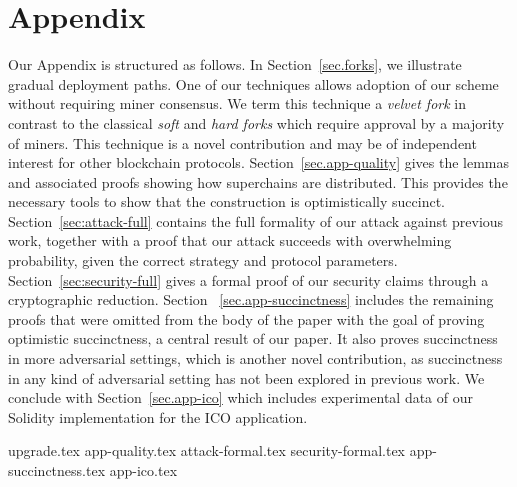 \appendix
\section*{Appendix}

Our Appendix is structured as follows. In Section~\ref{sec.forks}, we illustrate
gradual deployment paths. One of our techniques allows adoption of our scheme
without requiring miner consensus. We term this technique a \emph{velvet fork}
in contrast to the classical \emph{soft} and \emph{hard forks} which require
approval by a majority of miners. This technique is a novel contribution and may
be of independent interest for other blockchain protocols.
Section~\ref{sec.app-quality} gives the lemmas and associated proofs showing how
superchains are distributed. This provides the necessary tools to show that the
construction is optimistically succinct. Section~\ref{sec:attack-full} contains
the full formality of our attack against previous work, together with a proof
that our attack succeeds with overwhelming probability, given the correct
strategy and protocol parameters. Section~\ref{sec:security-full} gives a formal
proof of our security claims through a cryptographic reduction. Section~
\ref{sec.app-succinctness} includes the remaining proofs that were omitted from
the body of the paper with the goal of proving optimistic succinctness, a
central result of our paper. It also proves succinctness in more adversarial
settings, which is another novel contribution, as succinctness in any kind of
adversarial setting has not been explored in previous work. We conclude with
Section~\ref{sec.app-ico} which includes experimental data of our Solidity
implementation for the ICO application.

{upgrade.tex}
{app-quality.tex}
{attack-formal.tex}
{security-formal.tex}
{app-succinctness.tex}
{app-ico.tex}
